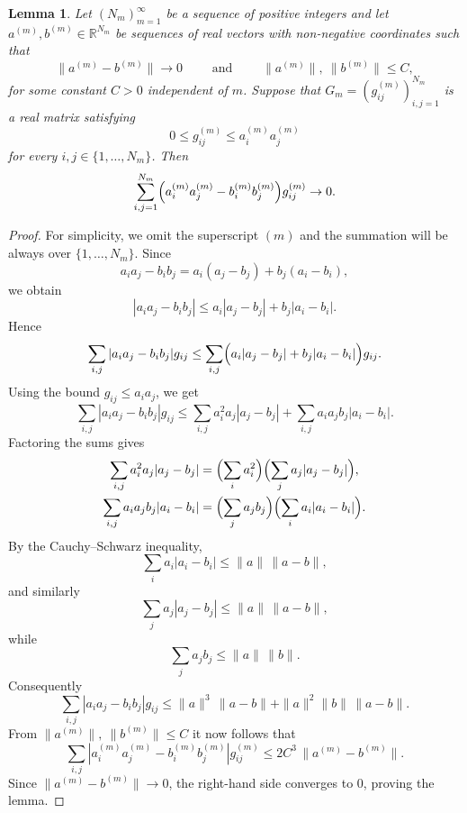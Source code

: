 \documentclass[12pt, reqno]{amsart}
\newtheorem{lem}[twr]{Lemma}
\theoremstyle{definition}
\theoremstyle{remark}
\numberwithin{equation}{section}
\begin{document}
\begin{lem} 
\label{operatornorm}
Let $(N_m)_{m=1}^{\infty}$ be a sequence of positive integers and let $ a^{(m)}, b^{(m)} \in \mathbb{R}^{N_m}$ be sequences of real vectors with non-negative coordinates such that 
$$ \|a^{(m)}-b^{(m)}\| \to 0 \qquad \text{ and } \qquad \|a^{(m)}\|,\ \|b^{(m)}\| \leq C, $$
for some constant $C>0$ independent of $m$. Suppose that $ G_m=(g_{ij}^{(m)})_{i,j=1}^{N_m} $ is a real matrix satisfying 
$$ 0\leq g_{ij}^{(m)} \leq a_i^{(m)}a_j^{(m)} $$ for every $i,j \in \{1, \ldots, N_m\}$. Then 
$$ \sum_{i,j=1}^{N_m} \Bigl( a_i^{(m)}a_j^{(m)} - b_i^{(m)}b_j^{(m)} \Bigr) g_{ij}^{(m)} \to 0. $$ 
\end{lem} 
\begin{proof} For simplicity, we omit the superscript $(m)$ and the summation will be always over $\{1, \ldots, N_m\}$. Since 
$$ a_i a_j-b_i b_j = a_i(a_j-b_j)+b_j(a_i-b_i), $$ 
we obtain 
$$ |a_i a_j-b_i b_j| \leq a_i|a_j-b_j| + b_j|a_i-b_i|. $$ Hence 
$$\sum_{i,j} |a_i a_j-b_i b_j| g_{ij}\leq \sum_{i,j} \Bigl( a_i|a_j-b_j| + b_j|a_i-b_i| \Bigr) g_{ij}.$$
Using the bound $ g_{ij}\leq a_i a_j$, we get
$$\sum_{i,j} |a_i a_j-b_i b_j| g_{ij} \leq \sum_{i,j} a_i^2 a_j |a_j-b_j| + \sum_{i,j} a_i a_j b_j |a_i-b_i|.$$
Factoring the sums gives 
\begin{align*} \sum_{i,j} a_i^2 a_j |a_j-b_j| &= \Bigl(\sum_i a_i^2\Bigr) \Bigl(\sum_j a_j|a_j-b_j|\Bigr), \\ \sum_{i,j} a_i a_j b_j |a_i-b_i| &= \Bigl(\sum_j a_j b_j\Bigr) \Bigl(\sum_i a_i|a_i-b_i|\Bigr). \end{align*}
By the Cauchy--Schwarz inequality, 
$$ \sum_i a_i|a_i-b_i| \leq \|a\|\,\|a-b\|, $$ and similarly 
$$ \sum_j a_j|a_j-b_j| \leq \|a\|\,\|a-b\|, $$ while 
$$ \sum_j a_j b_j \leq \|a\|\,\|b\|. $$ 
Consequently
$$\sum_{i,j} |a_i a_j-b_i b_j| g_{ij} \leq \|a\|^3\,\|a-b\| + \|a\|^2\|b\|\,\|a-b\|.$$
From $ \|a^{(m)}\|,\ \|b^{(m)}\|\leq C$ it now follows that 
$$ \sum_{i,j} |a_i^{(m)}a_j^{(m)}-b_i^{(m)}b_j^{(m)}| g_{ij}^{(m)} \leq 2C^3\, \|a^{(m)}-b^{(m)}\|. $$ 
Since $ \|a^{(m)}-b^{(m)}\| \to 0$, the right-hand side converges to $0$, proving the lemma. 
\end{proof}
\end{document}
